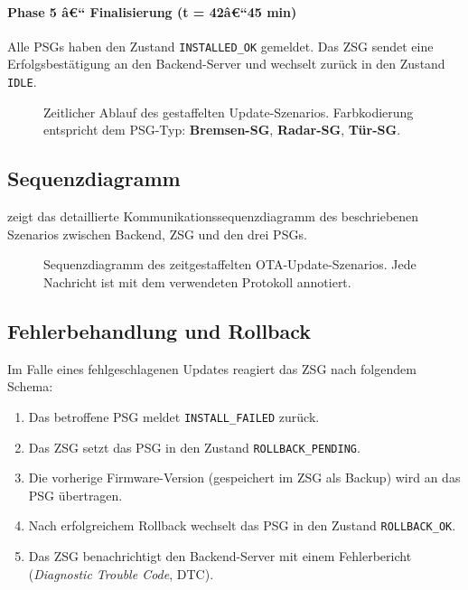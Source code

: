 ﻿\documentclass[12pt,a4paper,twoside]{article}
\begin{document}
\paragraph{Phase 5 â€“ Finalisierung (t = 42â€“45 min)}
Alle PSGs haben den Zustand \texttt{INSTALLED\_OK} gemeldet. Das ZSG
sendet eine Erfolgsbestätigung an den Backend-Server und wechselt zurück
in den Zustand \texttt{IDLE}.

\begin{figure}[h!]
  \centering
  
  \caption{Zeitlicher Ablauf des gestaffelten Update-Szenarios.
    Farbkodierung entspricht dem PSG-Typ:
    \textcolor{autosarblue}{\textbf{Bremsen-SG}},
    \textcolor{autosargreen}{\textbf{Radar-SG}},
    \textcolor{autosarorange}{\textbf{Tür-SG}}.}
  \label{fig:timeline}
\end{figure}

\subsection{Sequenzdiagramm}
\label{subsec:sequenz}

 zeigt das detaillierte Kommunikationssequenzdiagramm
des beschriebenen Szenarios zwischen Backend, ZSG und den drei PSGs.

\begin{figure}[h!]
  \centering
  
  \caption{Sequenzdiagramm des zeitgestaffelten OTA-Update-Szenarios.
    Jede Nachricht ist mit dem verwendeten Protokoll annotiert.}
  \label{fig:sequence}
\end{figure}

\subsection{Fehlerbehandlung und Rollback}

Im Falle eines fehlgeschlagenen Updates reagiert das ZSG nach
folgendem Schema:

\begin{enumerate}
  \item Das betroffene PSG meldet \texttt{INSTALL\_FAILED} zurück.
  \item Das ZSG setzt das PSG in den Zustand \texttt{ROLLBACK\_PENDING}.
  \item Die vorherige Firmware-Version (gespeichert im ZSG als Backup)
    wird an das PSG übertragen.
  \item Nach erfolgreichem Rollback wechselt das PSG in den Zustand
    \texttt{ROLLBACK\_OK}.
  \item Das ZSG benachrichtigt den Backend-Server mit einem
    Fehlerbericht (\textit{Diagnostic Trouble Code}, DTC).
\end{enumerate}
\end{document}

